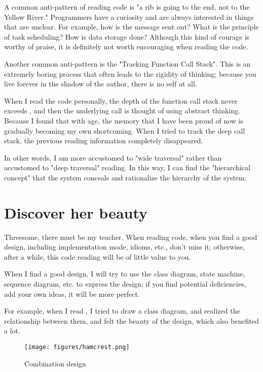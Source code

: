\begin{content}

A common anti-pattern of reading code is "a rib is going to the end, not to the Yellow River." Programmers have a curiosity and are always interested in things that are unclear. For example, how is the message sent out? What is the principle of task scheduling? How is data storage done? Although this kind of courage is worthy of praise, it is definitely not worth encouraging when reading the code.

Another common anti-pattern is the "Tracking Function Call Stack". This is an extremely boring process that often leads to the rigidity of thinking; because you live forever in the shadow of the author, there is no self at all.

When I read the code personally, the depth of the function call stack never exceeds , and then the underlying call is thought of using abstract thinking. Because I found that with age, the memory that I have been proud of now is gradually becoming my own shortcoming. When I tried to track the deep call stack, the previous reading information completely disappeared.

In other words, I am more accustomed to "wide traversal" rather than accustomed to "deep traversal" reading. In this way, I can find the "hierarchical concept" that the system conceals and rationalize the hierarchy of the system.

\end{content}

\section{Discover her beauty}

\begin{content}

Threesome, there must be my teacher. When reading code, when you find a good design, including implementation mode, idioms, etc., don't miss it; otherwise, after a while, this code reading will be of little value to you.

When I find a good design, I will try to use the class diagram, state machine, sequence diagram, etc. to express the design; if you find potential deficiencies, add your own ideas, it will be more perfect.

For example, when I read , I tried to draw a class diagram, and realized the relationship between them, and felt the beauty of the design, which also benefited a lot.

\begin{figure}[!h]
\centering
\texttt{[image: figures/hamcrest.png]}
\caption{Combination design}
 \label{fig:hamcrest}
\end{figure}

\end{content}

